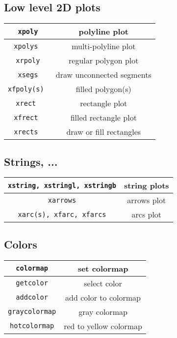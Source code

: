 \subsection{Low level 2D plots}
\begin{center}
\begin{tabular}{|c|c|}
\hline
{\tt xpoly} & polyline plot \\ \hline
{\tt xpolys } &  multi-polyline plot \\ \hline
{\tt xrpoly} & regular polygon plot \\ \hline
{\tt xsegs}  & draw unconnected segments\\ \hline
{\tt xfpoly(s) }  & filled polygon(s) \\ \hline
{\tt xrect }  & rectangle plot \\ \hline
{\tt xfrect }  & filled rectangle plot \\ \hline
{\tt xrects }  & draw or fill rectangles \\ \hline
\end{tabular}
\end{center}

\subsection{Strings, ...}
\begin{center}
\begin{tabular}{|c|c|}
\hline
{\tt xstring, xstringl, xstringb} & string plots \\ \hline
{\tt xarrows} & arrows plot \\ \hline
{\tt xarc(s), xfarc, xfarcs} & arcs plot \\ \hline
\end{tabular}
\end{center}

\subsection{Colors}
\begin{center}
\begin{tabular}{|c|c|}
\hline
{\tt colormap} & set colormap \\ \hline
{\tt getcolor} & select color \\ \hline
{\tt addcolor} & add color to colormap \\ \hline
{\tt graycolormap} & gray colormap \\ \hline
{\tt hotcolormap} & red to yellow colormap \\ \hline
\end{tabular}
\end{center}

